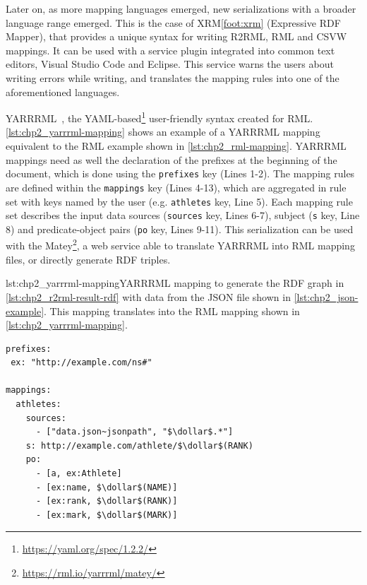 Later on, as more mapping languages emerged, new serializations with a broader language range emerged. This is the case of XRM\cref{foot:xrm} (Expressive RDF Mapper), that provides a unique syntax for writing R2RML, RML and CSVW mappings. It can be used with a service plugin integrated into common text editors, Visual Studio Code and Eclipse. This service warns the users about writing errors while writing, and translates the mapping rules into one of the aforementioned languages. 

YARRRML~\parencite{Heyvaert2018yarrrml}, the YAML-based\footnote{\url{https://yaml.org/spec/1.2.2/}} user-friendly syntax created for RML. 
\cref{lst:chp2_yarrrml-mapping} shows an example of a YARRRML mapping equivalent to the RML example shown in \cref{lst:chp2_rml-mapping}. 
YARRRML mappings need as well the declaration of the prefixes at the beginning of the document, which is done using the \texttt{prefixes} key (Lines 1-2). The mapping rules are defined within the \texttt{mappings} key (Lines 4-13), which are aggregated in rule set with keys named by the user (e.g. \texttt{athletes} key, Line 5). Each mapping rule set describes the input data sources (\texttt{sources} key, Lines 6-7), subject (\texttt{s} key, Line 8) and predicate-object pairs (\texttt{po} key, Lines 9-11).
This serialization can be used with the Matey\footnote{\url{https://rml.io/yarrrml/matey/}}, a web service able to translate YARRRML into RML mapping files, or directly generate RDF triples. 

\begin{captionedlisting}{lst:chp2_yarrrml-mapping}{YARRRML mapping to generate the RDF graph in \cref{lst:chp2_r2rml-result-rdf} with data from the JSON file shown in \cref{lst:chp2_json-example}. This mapping translates into the RML mapping shown in \cref{lst:chp2_yarrrml-mapping}.}
\centering
{\begin{lstlisting}[language=yarrrml]
prefixes:
 ex: "http://example.com/ns#"

mappings:
  athletes:
    sources:
      - ["data.json~jsonpath", "$\dollar$.*"]
    s: http://example.com/athlete/$\dollar$(RANK)
    po:
      - [a, ex:Athlete]
      - [ex:name, $\dollar$(NAME)]
      - [ex:rank, $\dollar$(RANK)]
      - [ex:mark, $\dollar$(MARK)]
\end{lstlisting}}
\end{captionedlisting}
